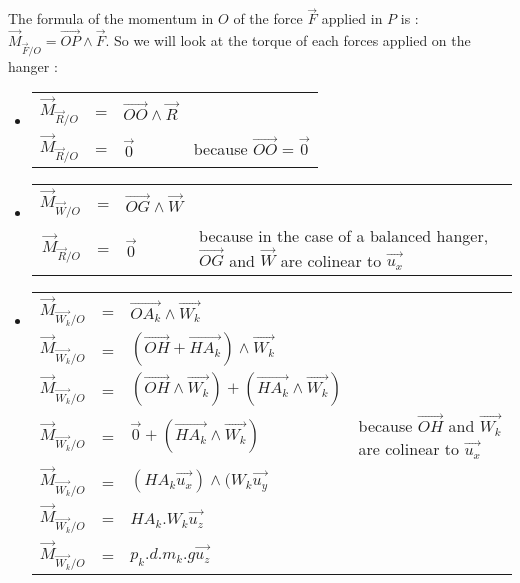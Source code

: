 \documentclass{report}
\begin{document}
The formula of the momentum in $O$ of the force $\overrightarrow{F}$ applied in $P$ is : $\overrightarrow{M}_{\overrightarrow{F}/O } = \overrightarrow {OP} \wedge \overrightarrow{F}$.
So we will look at the torque of each forces applied on the hanger :
\begin{itemize}
\item \begin{tabular}{rcll}
$\overrightarrow{M}_{\overrightarrow{R}/O } $ & = & $\overrightarrow {OO} \wedge \overrightarrow{R}$ & \\
$\overrightarrow{M}_{\overrightarrow{R}/O } $ & = & $\overrightarrow{0}$ & because $\overrightarrow {OO} = \overrightarrow{0}$\\
\end{tabular}
\item \begin{tabular}{rcll}
$\overrightarrow{M}_{\overrightarrow{W}/O } $ & = & $\overrightarrow {OG} \wedge \overrightarrow{W}$ & \\
$\overrightarrow{M}_{\overrightarrow{R}/O } $ & = & $\overrightarrow{0}$ & because in the case of a balanced hanger, $\overrightarrow {OG}$ and $\overrightarrow {W}$ are colinear to $\overrightarrow{u_x}$\\
\end{tabular}
\item \begin{tabular}{rcll}
$\overrightarrow{M}_{\overrightarrow{W_k}/O } $ & = & $\overrightarrow {OA_k} \wedge \overrightarrow{W_k}$ & \\
$\overrightarrow{M}_{\overrightarrow{W_k}/O } $ & = & $(\overrightarrow {OH} + \overrightarrow {HA_k}) \wedge \overrightarrow{W_k}$ & \\
$\overrightarrow{M}_{\overrightarrow{W_k}/O } $ & = & $(\overrightarrow {OH} \wedge \overrightarrow{W_k}) + (\overrightarrow {HA_k} \wedge \overrightarrow{W_k})$ & \\
$\overrightarrow{M}_{\overrightarrow{W_k}/O } $ & = & $\overrightarrow {0} + (\overrightarrow {HA_k} \wedge \overrightarrow{W_k})$ & because $\overrightarrow {OH}$ and $\overrightarrow {W_k}$ are colinear to $\overrightarrow{u_x}$\\
$\overrightarrow{M}_{\overrightarrow{W_k}/O } $ & = & $(HA_k \overrightarrow {u_x}) \wedge (W_k \overrightarrow{u_y}$ & \\
$\overrightarrow{M}_{\overrightarrow{W_k}/O } $ & = & $HA_k . W_k \overrightarrow{u_z}$ & \\
$\overrightarrow{M}_{\overrightarrow{W_k}/O } $ & = & $p_k . d . m_k . g \overrightarrow{u_z}$ & \\
\end{tabular}
\end{itemize}
\end{document}
